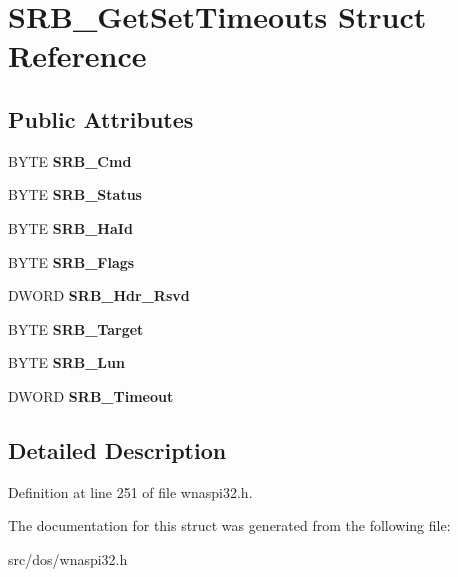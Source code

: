 \hypertarget{structSRB__GetSetTimeouts}{\section{S\-R\-B\-\_\-\-Get\-Set\-Timeouts Struct Reference}
\label{structSRB__GetSetTimeouts}
}
\subsection*{Public Attributes}
\begin{DoxyCompactItemize}
\item 
\hypertarget{structSRB__GetSetTimeouts_ae9908c75eea0618eaefe2553a0a1a9c6}{B\-Y\-T\-E {\bfseries S\-R\-B\-\_\-\-Cmd}}\label{structSRB__GetSetTimeouts_ae9908c75eea0618eaefe2553a0a1a9c6}

\item 
\hypertarget{structSRB__GetSetTimeouts_a14fd1061f99c7b80ba84c7262897c9fb}{B\-Y\-T\-E {\bfseries S\-R\-B\-\_\-\-Status}}\label{structSRB__GetSetTimeouts_a14fd1061f99c7b80ba84c7262897c9fb}

\item 
\hypertarget{structSRB__GetSetTimeouts_acb9e283214ce6c21e9e1f0f45cabbd01}{B\-Y\-T\-E {\bfseries S\-R\-B\-\_\-\-Ha\-Id}}\label{structSRB__GetSetTimeouts_acb9e283214ce6c21e9e1f0f45cabbd01}

\item 
\hypertarget{structSRB__GetSetTimeouts_a77e7761589cc310e1e1b44530af155f4}{B\-Y\-T\-E {\bfseries S\-R\-B\-\_\-\-Flags}}\label{structSRB__GetSetTimeouts_a77e7761589cc310e1e1b44530af155f4}

\item 
\hypertarget{structSRB__GetSetTimeouts_a0a5acecd6ca2fb8e823d8cf8feaca58d}{D\-W\-O\-R\-D {\bfseries S\-R\-B\-\_\-\-Hdr\-\_\-\-Rsvd}}\label{structSRB__GetSetTimeouts_a0a5acecd6ca2fb8e823d8cf8feaca58d}

\item 
\hypertarget{structSRB__GetSetTimeouts_a0f5a7a44513f55b7b3a37e52aef74daa}{B\-Y\-T\-E {\bfseries S\-R\-B\-\_\-\-Target}}\label{structSRB__GetSetTimeouts_a0f5a7a44513f55b7b3a37e52aef74daa}

\item 
\hypertarget{structSRB__GetSetTimeouts_a118e2f7653c5de85fd0b4c36ad7bfc5e}{B\-Y\-T\-E {\bfseries S\-R\-B\-\_\-\-Lun}}\label{structSRB__GetSetTimeouts_a118e2f7653c5de85fd0b4c36ad7bfc5e}

\item 
\hypertarget{structSRB__GetSetTimeouts_af6578e7529abdebb2335e8a5eef63b6b}{D\-W\-O\-R\-D {\bfseries S\-R\-B\-\_\-\-Timeout}}\label{structSRB__GetSetTimeouts_af6578e7529abdebb2335e8a5eef63b6b}

\end{DoxyCompactItemize}


\subsection{Detailed Description}


Definition at line 251 of file wnaspi32.\-h.



The documentation for this struct was generated from the following file\-:\begin{DoxyCompactItemize}
\item 
src/dos/wnaspi32.\-h\end{DoxyCompactItemize}
